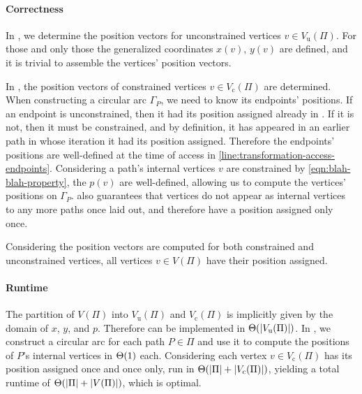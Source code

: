 \clearpage



\paragraph{Correctness}

In , we determine the position vectors for unconstrained vertices ${v \in V_\text{u}(\Pi)}$. For those and only those the generalized coordinates ${x(v)}$, ${y(v)}$ are defined, and it is trivial to assemble the vertices' position vectors.

In , the position vectors of constrained vertices ${v \in V_\text{c}(\Pi)}$ are determined. When constructing a circular arc ${\Gamma_P}$, we need to know its endpoints' positions. If an endpoint is unconstrained, then it had its position assigned already in . If it is not, then it must be constrained, and by definition, it has appeared in an earlier path in whose iteration it had its position assigned. Therefore the endpoints' positions are well-defined at the time of access in \cref{line:transformation-access-endpoints}. Considering a path's internal vertices ${v}$ are constrained by \cref{eqn:blah-blah-property}, the ${p(v)}$ are well-defined, allowing us to compute the vertices' positions on ${\Gamma_P}$.  also guarantees that vertices do not appear as internal vertices to any more paths once laid out, and therefore have a position assigned only once.

Considering the position vectors are computed for both constrained and unconstrained vertices, all vertices ${v \in V(\Pi)}$ have their position assigned.



\paragraph{Runtime}

The partition of ${V(\Pi)}$ into ${V_\text{u}(\Pi)}$ and ${V_\text{c}(\Pi)}$ is implicitly given by the domain of ${x}$, ${y}$, and ${p}$. Therefore  can be implemented in ${\Theta(\left\lvert V_\text{u}(\Pi)\right\rvert)}$. In , we construct a circular arc for each path ${P \in \Pi}$ and use it to compute the positions of ${P}$'s internal vertices in ${\Theta(1)}$ each. Considering each vertex ${v \in V_\text{c}(\Pi)}$ has its position assigned once and once only,  run in ${\Theta(\left\lvert\Pi\right\rvert + \left\lvert V_\text{c}(\Pi)\right\rvert)}$, yielding a total runtime of ${\Theta(\left\lvert\Pi\right\rvert + \left\lvert V(\Pi)\right\rvert)}$, which is optimal.



